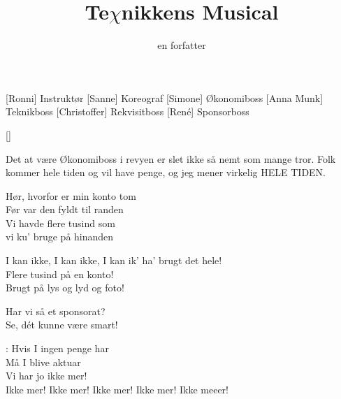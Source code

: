 \documentclass[a4paper,11pt]{article}
\title{Te$\chi$nikkens Musical}
\author{en forfatter}
\begin{document}
\maketitle

\begin{roles}
[Ronni] Instruktør
[Sanne] Koreograf
[Simone] Økonomiboss
[Anna Munk] Teknikboss
[Christoffer] Rekvisitboss
[René] Sponsorboss
\end{roles}

\begin{props}
[]
\end{props}

\begin{sketch}


 Det at være Økonomiboss i revyen er slet ikke så nemt som mange tror. Folk kommer hele tiden og vil have penge, og jeg mener virkelig HELE TIDEN.



 Hør, hvorfor er min konto tom  \\
Før var den fyldt til randen \\
Vi havde flere tusind som \\
vi ku' bruge på hinanden


 I kan ikke, I kan ikke, I kan ik' ha' brugt det hele! \\
Flere tusind på en konto! \\
Brugt på lys og lyd og foto!


 Har vi så et sponsorat? \\
Se, dét kunne være smart!

 : Hvis I ingen penge har \\
Må I blive aktuar \\
Vi har jo ikke mer! \\
Ikke mer! Ikke mer! Ikke mer! Ikke mer! Ikke meeer!



\end{sketch}
\end{document}
